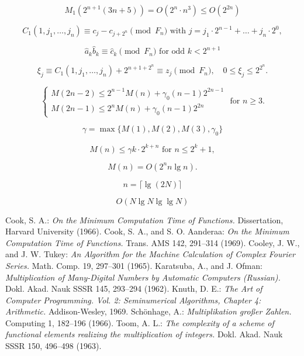 \documentclass{article}
\begin{document}
\[
M_1(2^{n + 1} (3n + 5)) = O(2^n \cdot n^3) \le O(2^{2n})
\]

\[
C_1(1, j_1, \ldots, j_n) \equiv c_j - c_{j + 2^n} \pmod{F_n}\text{ with }j = j_1 \cdot 2^{n - 1} + \ldots + j_n \cdot 2^0,
\]

\[
\hat{a}_k \hat{b}_k \equiv \hat{c}_k \pmod{F_n}\text{ for odd }k < 2^{n + 1}
\]

\[
\xi_j \equiv C_1(1, j_1, \ldots, j_n) + 2^{n + 1 + 2^n} \equiv z_j \pmod{F_n}, \quad 0 \le \xi_j \le 2^{2^n}.
\]

\[
\tag{4.15}
\begin{cases}
M(2n - 2) \le 2^{n - 1} M(n) + \gamma_0 (n - 1) 2^{2n - 1} \\
M (2n - 1) \le 2^n M(n) + \gamma_0 (n - 1) 2^{2n}
\end{cases} \text{ for } n \ge 3.
\]

\[
\gamma = \max \{M(1), M(2), M(3), \gamma_0\}
\]

\[
M(n) \le \gamma k \cdot 2^{k + n}\text{ for } n \le 2^k + 1,
\]

\[
M(n) = O(2^n n \lg n).
\]

\[
n = \lceil \lg(2N)\rceil
\]

\[
O(N \lg N \lg \lg N)
\]

\begin{thebibliography}{99}
 Cook, S. A.: \textit{On the Minimum Computation Time of Functions.} Dissertation, Harvard University (1966).
 Cook, S. A., and S. O. Aanderaa: \textit{On the Minimum Computation Time of Functions.} Trans. AMS 142, 291--314 (1969).
 Cooley, J. W., and J. W. Tukey: \textit{An Algorithm for the Machine Calculation of Complex Fourier Series.} Math. Comp. 19, 297--301 (1965).
 Karatsuba, A., and J. Ofman: \textit{Multiplication of Many-Digital Numbers by Automatic Computers (Russian).} Dokl. Akad. Nauk SSSR 145, 293--294 (1962).
 Knuth, D. E.: \textit{The Art of Computer Programming. Vol. 2: Seminumerical Algorithms, Chapter 4: Arithmetic.} Addison-Wesley, 1969.
 Schönhage, A.: \textit{Multiplikation großer Zahlen.} Computing 1, 182--196 (1966).
 Toom, A. L.: \textit{The complexity of a scheme of functional elements realizing the multiplication of integers.} Dokl. Akad. Nauk SSSR 150, 496--498 (1963).
\end{thebibliography}
\end{document}
